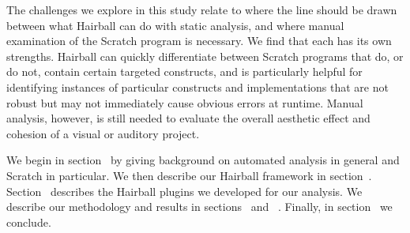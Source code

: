 The challenges we explore in this study relate to where the line
should be drawn between what Hairball can do with static analysis, and
where manual examination of the Scratch program is necessary.  We find
that each has its own strengths.  Hairball can quickly differentiate
between Scratch programs that do, or do not, contain certain targeted
constructs, and is particularly helpful for identifying instances of
particular constructs and implementations that are not robust but may
not immediately cause obvious errors at runtime.  Manual analysis,
however, is still needed to evaluate the overall aesthetic effect and
cohesion of a visual or auditory project.

We begin in section~ by giving background on automated
analysis in general and Scratch in particular.  We then describe our Hairball
framework in section~.  Section~
describes the Hairball plugins we developed for our analysis.  We describe our
methodology and results in sections~ and
~.  Finally, in section~ we
conclude.

